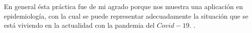 \documentclass{article}
\begin{document}
En general ésta práctica fue de mi agrado porque nos muestra una aplicación en epidemiología, con la cual se puede representar adecuadamente la situación que se está viviendo en la actualidad con la pandemia del $Covid-19$. 
\newpage
.
\bigskip



\end{document}
